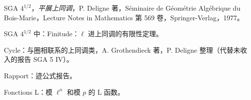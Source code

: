 SGA $4^{1/2}$，\emph{平展上同调}，P. Deligne 著，Séminaire de Géométrie Algébrique du Bois-Marie，Lecture Notes in Mathematics 第 569 卷，Springer-Verlag，1977。

SGA $4^{1/2}$ 中：Finitude：$\ell$ 进上同调的有限性定理。

Cycle：与圈相联系的上同调类，A. Grothendieck 著，P. Deligne 整理（代替未收入的报告 SGA 5 IV）。

Rapport：迹公式报告。

Fonctions L：模 $\ell^n$ 和模 $p$ 的 L 函数。

